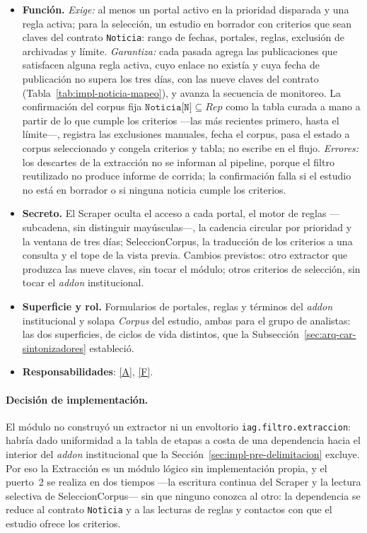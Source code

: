 \documentclass[12pt]{report}
\DeclareRobustCommand{\resp}[1]{\hyperref[tab:registro-responsabilidades]{\textcolor{respcolor}{[#1]}}}
\begin{document}
\begin{itemize}
  \item \textbf{Función.} \textit{Exige:} al menos un portal activo en la prioridad disparada y una regla activa; para la selección, un estudio en borrador con criterios que sean claves del contrato \texttt{Noticia}: rango de fechas, portales, reglas, exclusión de archivadas y límite. \textit{Garantiza:} cada pasada agrega las publicaciones que satisfacen alguna regla activa, cuyo enlace no existía y cuya fecha de publicación no supera los tres días, con las nueve claves del contrato (Tabla~\ref{tab:impl-noticia-mapeo}), y avanza la secuencia de monitoreo. La confirmación del corpus fija \(\texttt{Noticia[N]} \subseteq \mathit{Rep}\) como la tabla curada a mano a partir de lo que cumple los criterios ---las más recientes primero, hasta el límite---, registra las exclusiones manuales, fecha el corpus, pasa el estado a corpus seleccionado y congela criterios y tabla; no escribe en el flujo. \textit{Errores:} los descartes de la extracción no se informan al pipeline, porque el filtro reutilizado no produce informe de corrida; la confirmación falla si el estudio no está en borrador o si ninguna noticia cumple los criterios.
  \item \textbf{Secreto.} El Scraper oculta el acceso a cada portal, el motor de reglas ---subcadena, sin distinguir mayúsculas---, la cadencia circular por prioridad y la ventana de tres días; SeleccionCorpus, la traducción de los criterios a una consulta y el tope de la vista previa. Cambios previstos: otro extractor que produzca las nueve claves, sin tocar el módulo; otros criterios de selección, sin tocar el \textit{addon} institucional.
  \item \textbf{Superficie y rol.} Formularios de portales, reglas y términos del \textit{addon} institucional y solapa \textit{Corpus} del estudio, ambas para el grupo de analistas: las dos superficies, de ciclos de vida distintos, que la Subsección~\ref{sec:arq-car-sintonizadores} estableció.
  \item \textbf{Responsabilidades}: \resp{A}, \resp{F}.
\end{itemize}

\paragraph{Decisión de implementación.} El módulo no construyó un extractor ni un envoltorio \texttt{iag.filtro.extraccion}: habría dado uniformidad a la tabla de etapas a costa de una dependencia hacia el interior del \textit{addon} institucional que la Sección~\ref{sec:impl-pre-delimitacion} excluye. Por eso la Extracción es un módulo lógico sin implementación propia, y el puerto~2 se realiza en dos tiempos ---la escritura continua del Scraper y la lectura selectiva de SeleccionCorpus--- sin que ninguno conozca al otro: la dependencia se reduce al contrato \texttt{Noticia} y a las lecturas de reglas y contactos con que el estudio ofrece los criterios.
\end{document}
